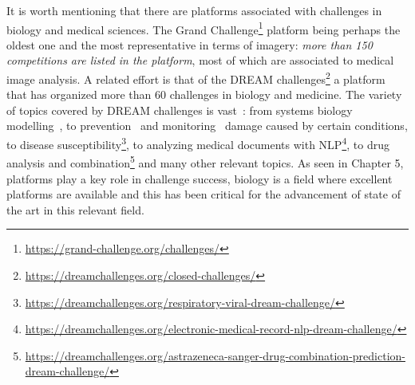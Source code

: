 \documentclass[twoside,11pt]{article}
\begin{document}
It is worth mentioning that there are  platforms associated with challenges in biology and medical sciences. The Grand Challenge\footnote{\url{https://grand-challenge.org/challenges/}} platform being perhaps the oldest one and the most representative in terms of imagery: \emph{more than 150 competitions are listed in the platform}, most of which are associated to medical image analysis. A related effort is that of the DREAM challenges\footnote{\url{https://dreamchallenges.org/closed-challenges/}} a platform that has organized more than 60 challenges in biology and medicine. The variety of topics covered by DREAM challenges is vast~\citep{https://doi.org/10.1111/j.1749-6632.2009.04497.x}: from systems biology modelling~\citep{MEYER2021636}, to prevention~\citep{Tarca2020.06.05.130971} and monitoring~\citep{10.1001/jamanetworkopen.2022.27423} damage caused by certain conditions, to disease susceptibility\footnote{\url{https://dreamchallenges.org/respiratory-viral-dream-challenge/}}, to analyzing medical documents with NLP\footnote{\url{https://dreamchallenges.org/electronic-medical-record-nlp-dream-challenge/}}, to drug analysis and combination\footnote{\url{https://dreamchallenges.org/astrazeneca-sanger-drug-combination-prediction-dream-challenge/}} and many other relevant topics. As seen in Chapter 5, platforms play a key role in challenge success, biology is a  field where excellent platforms are available and this has been critical for the advancement of state of the art in this relevant field. 
\end{document}
